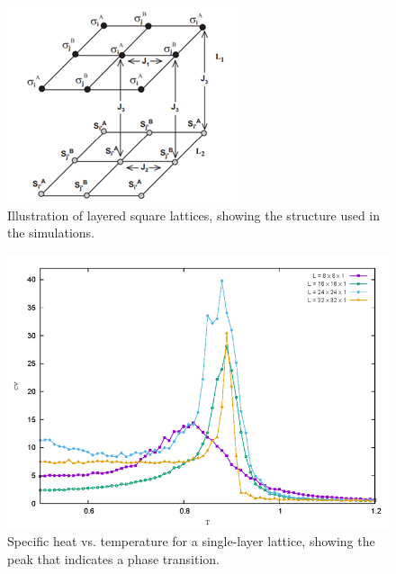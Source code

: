 \documentclass[conference, compsoc, twoside]{IEEEtran}
\begin{document}
\begin{figure}[ht]
    \centering
    \includegraphics[width=0.9\columnwidth]{Gambar 8. Ilustrasi Kisi Persegi Berlapis.png}
    \caption{Illustration of layered square lattices, showing the structure used in the simulations.}
    \label{fig:layered_lattice}
\end{figure}

\begin{figure}[ht]
    \centering
    \includegraphics[width=0.9\columnwidth]{Gambar 9. Cv vs T pada Kisi Satu Lapis.png}
    \caption{Specific heat vs. temperature for a single-layer lattice, showing the peak that indicates a phase transition.}
    \label{fig:cv_single_layer}
\end{figure}
\end{document}
